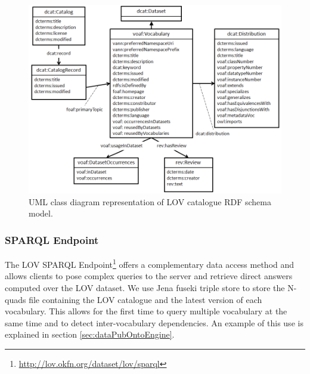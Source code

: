 \documentclass{iosart2c}
\begin{document}
\begin{figure}[!htb]
\includegraphics[scale=0.5]{model.png}
\caption{UML class diagram representation of LOV catalogue RDF schema model.}
\label{fig:model}
\end{figure}


\subsubsection{SPARQL Endpoint}
The LOV SPARQL Endpoint\footnote{\url{http://lov.okfn.org/dataset/lov/sparql}} offers a complementary data access method and allows clients to pose complex queries to the server and retrieve direct answers computed over the LOV dataset. We use Jena fuseki triple store to store the N-quads file containing the LOV catalogue and the latest version of each vocabulary. This allows for the first time to query multiple vocabulary at the same time and to detect inter-vocabulary dependencies. An example of this use is explained in section \ref{sec:dataPubOntoEngine}.
\end{document}
